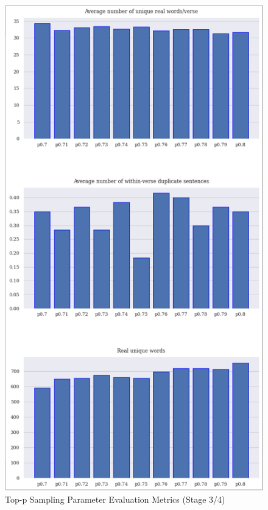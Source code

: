 \begin{figure}[h]
    \centering
    \includegraphics[scale=0.85,keepaspectratio=true]{figures/top-p_param_eval_s3.png}
    \caption{Top-p Sampling Parameter Evaluation Metrics (Stage 3/4)}
    \label{fig:top-p-param-eval-s3}
\end{figure}

